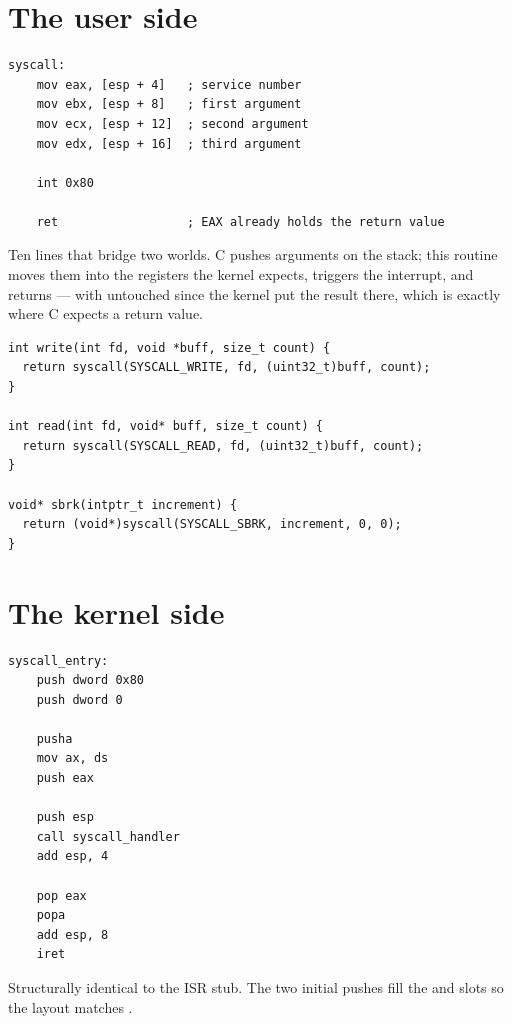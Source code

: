 \section{The user side}

\begin{lstlisting}[style=asm]
syscall:
    mov eax, [esp + 4]   ; service number
    mov ebx, [esp + 8]   ; first argument
    mov ecx, [esp + 12]  ; second argument
    mov edx, [esp + 16]  ; third argument

    int 0x80

    ret                  ; EAX already holds the return value
\end{lstlisting}

Ten lines that bridge two worlds. C pushes arguments on the stack; this routine moves them into the
registers the kernel expects, triggers the interrupt, and returns --- with  untouched since
the kernel put the result there, which is exactly where C expects a return value.

\begin{lstlisting}[style=c]
int write(int fd, void *buff, size_t count) {
  return syscall(SYSCALL_WRITE, fd, (uint32_t)buff, count);
}

int read(int fd, void* buff, size_t count) {
  return syscall(SYSCALL_READ, fd, (uint32_t)buff, count);
}

void* sbrk(intptr_t increment) {
  return (void*)syscall(SYSCALL_SBRK, increment, 0, 0);
}
\end{lstlisting}

\section{The kernel side}

\begin{lstlisting}[style=asm]
syscall_entry:
    push dword 0x80
    push dword 0

    pusha
    mov ax, ds
    push eax

    push esp
    call syscall_handler
    add esp, 4

    pop eax
    popa
    add esp, 8
    iret
\end{lstlisting}

Structurally identical to the ISR stub. The two initial pushes fill the  and
 slots so the layout matches .

